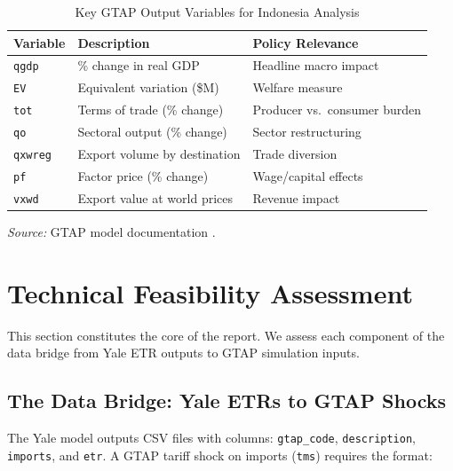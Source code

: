 \documentclass[12pt,a4paper]{article}
\begin{document}
\begin{table}[htbp]
\centering
\caption{Key GTAP Output Variables for Indonesia Analysis}
\begin{tabular}{lll}
\toprule
\textbf{Variable} & \textbf{Description} & \textbf{Policy Relevance} \\
\midrule
\texttt{qgdp}  & \% change in real GDP         & Headline macro impact \\
\texttt{EV}     & Equivalent variation (\$M)    & Welfare measure \\
\texttt{tot}    & Terms of trade (\% change)    & Producer vs.\ consumer burden \\
\texttt{qo}     & Sectoral output (\% change)   & Sector restructuring \\
\texttt{qxwreg} & Export volume by destination   & Trade diversion \\
\texttt{pf}     & Factor price (\% change)      & Wage/capital effects \\
\texttt{vxwd}   & Export value at world prices   & Revenue impact \\
\bottomrule
\end{tabular}
\par\smallskip
\begin{minipage}{\linewidth}
\footnotesize
\textit{Source:} GTAP model documentation \cite{hertel1997}.
\end{minipage}
\label{tab:gtap_vars}
\end{table}

\section{Technical Feasibility Assessment}
\label{sec:feasibility}

This section constitutes the core of the report. We assess each component of the data bridge from Yale ETR outputs to GTAP simulation inputs.

\subsection{The Data Bridge: Yale ETRs to GTAP Shocks}

The Yale model outputs CSV files with columns: \texttt{gtap\_code}, \texttt{description}, \texttt{imports}, and \texttt{etr}. A GTAP tariff shock on imports (\texttt{tms}) requires the format:
\end{document}
